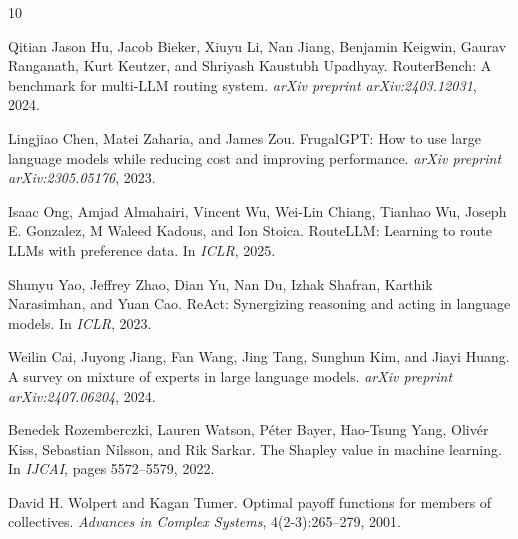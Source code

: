 \documentclass{article}
\begin{document}

\begin{thebibliography}{10}

Qitian Jason Hu, Jacob Bieker, Xiuyu Li, Nan Jiang, Benjamin Keigwin, Gaurav Ranganath, Kurt Keutzer, and Shriyash Kaustubh Upadhyay.
\newblock RouterBench: A benchmark for multi-LLM routing system.
\newblock \emph{arXiv preprint arXiv:2403.12031}, 2024.

Lingjiao Chen, Matei Zaharia, and James Zou.
\newblock FrugalGPT: How to use large language models while reducing cost and improving performance.
\newblock \emph{arXiv preprint arXiv:2305.05176}, 2023.

Isaac Ong, Amjad Almahairi, Vincent Wu, Wei-Lin Chiang, Tianhao Wu, Joseph E. Gonzalez, M Waleed Kadous, and Ion Stoica.
\newblock RouteLLM: Learning to route LLMs with preference data.
\newblock In \emph{ICLR}, 2025.

Shunyu Yao, Jeffrey Zhao, Dian Yu, Nan Du, Izhak Shafran, Karthik Narasimhan, and Yuan Cao.
\newblock ReAct: Synergizing reasoning and acting in language models.
\newblock In \emph{ICLR}, 2023.

Weilin Cai, Juyong Jiang, Fan Wang, Jing Tang, Sunghun Kim, and Jiayi Huang.
\newblock A survey on mixture of experts in large language models.
\newblock \emph{arXiv preprint arXiv:2407.06204}, 2024.

Benedek Rozemberczki, Lauren Watson, P{\'e}ter Bayer, Hao-Tsung Yang, Oliv{\'e}r Kiss, Sebastian Nilsson, and Rik Sarkar.
\newblock The Shapley value in machine learning.
\newblock In \emph{IJCAI}, pages 5572--5579, 2022.

David H. Wolpert and Kagan Tumer.
\newblock Optimal payoff functions for members of collectives.
\newblock \emph{Advances in Complex Systems}, 4(2-3):265--279, 2001.

\end{thebibliography}

\appendix
\end{document}
